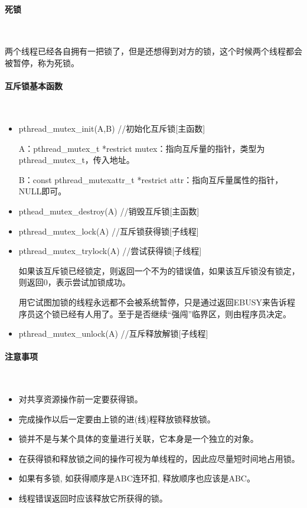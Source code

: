 \documentclass[UTF8]{article}%
\begin{document}
\paragraph{死锁}~{}

两个线程已经各自拥有一把锁了，但是还想得到对方的锁，这个时候两个线程都会被暂停，称为死锁。

\paragraph{互斥锁基本函数}~{}

\begin{itemize}
    \item pthread\_mutex\_init(A,B) //初始化互斥锁[主函数]
    
    A：pthread\_mutex\_t *restrict mutex：指向互斥量的指针，类型为pthread\_mutex\_t，传入地址。

    B：const pthread\_mutexattr\_t *restrict attr：指向互斥量属性的指针，NULL即可。

    \item pthead\_mutex\_destroy(A) //销毁互斥锁[主函数]
    \item pthread\_mutex\_lock(A) //互斥锁获得锁[子线程]
    \item pthread\_mutex\_trylock(A) //尝试获得锁[子线程]

    如果该互斥锁已经锁定，则返回一个不为的错误值，如果该互斥锁没有锁定，则返回0，表示尝试加锁成功。

    用它试图加锁的线程永远都不会被系统暂停，只是通过返回EBUSY来告诉程序员这个锁已经有人用了。至于是否继续“强闯”临界区，则由程序员决定。

    \item pthread\_mutex\_unlock(A) //互斥释放解锁[子线程]
\end{itemize}

\paragraph{注意事项}~{}

\begin{itemize}
    \item 对共享资源操作前一定要获得锁。
    \item 完成操作以后一定要由上锁的进(线)程释放锁释放锁。
    \item 锁并不是与某个具体的变量进行关联，它本身是一个独立的对象。
    \item 在获得锁和释放锁之间的操作可视为单线程的，因此应尽量短时间地占用锁。
    \item 如果有多锁, 如获得顺序是ABC连环扣, 释放顺序也应该是ABC。
    \item 线程错误返回时应该释放它所获得的锁。
\end{itemize}
\end{document}
